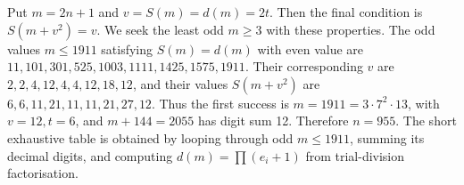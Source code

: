Put $m=2n+1$ and $v=S(m)=d(m)=2t$. Then the final condition is $S(m+v^2)=v$. We seek the least odd $m\ge3$ with these properties. The odd values $m\le1911$ satisfying $S(m)=d(m)$ with even value are $11,101,301,525,1003,1111,1425,1575,1911$. Their corresponding $v$ are $2,2,4,12,4,4,12,18,12$, and their values $S(m+v^2)$ are $6,6,11,21,11,11,21,27,12$. Thus the first success is $m=1911=3\cdot7^2\cdot13$, with $v=12,t=6$, and $m+144=2055$ has digit sum 12. Therefore $\boxed{n=955}$. The short exhaustive table is obtained by looping through odd $m\le1911$, summing its decimal digits, and computing $d(m)=\prod(e_i+1)$ from trial-division factorisation.
